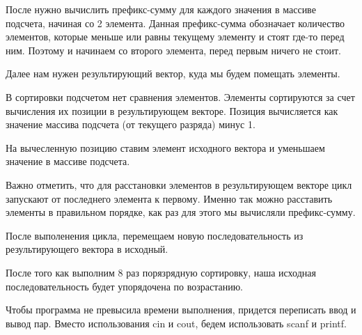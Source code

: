 После нужно вычислить префикс-сумму для каждого значения в массиве подсчета, начиная со 2 элемента.
Данная префикс-сумма обозначает количество элементов, которые меньше или равны текущему элементу и стоят где-то перед ним.
Поэтому и начинаем со второго элемента, перед первым ничего не стоит.

Далее нам нужен результирующий вектор, куда мы будем помещать элементы. 

В сортировки подсчетом нет сравнения элементов. Элементы сортируются за счет вычисления их позиции в результирующем векторе.
Позиция вычисляется как значение массива подсчета (от текущего разряда) минус 1.

На вычесленную позицию ставим элемент исходного вектора и уменьшаем значение в массиве подсчета.

Важно отметить, что для расстановки элементов в результирующем векторе цикл запускают от последнего элемента к первому.
Именно так можно расставить элементы в правильном порядке, как раз для этого мы вычисляли префикс-сумму.

После выполенения цикла, перемещаем новую последовательность из результирующего вектора в исходный.

После того как выполним 8 раз порязрядную сортировку, наша исходная последовательность будет упорядочена по возрастанию.


Чтобы программа не превысила времени выполнения, придется переписать ввод и вывод пар. Вместо использования cin  и cout,
бедем использовать scanf и printf.\\\\



